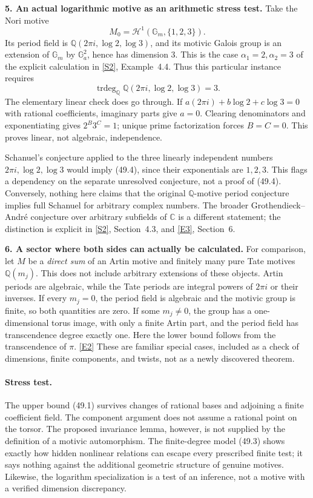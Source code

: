\documentclass[11pt,a4paper]{article}
\newcommand{\Q}{\mathbb{Q}}
\newcommand{\C}{\mathbb{C}}
\newcommand{\sref}[2]{\hyperlink{source:#1:#2}{[S#2]}}
\newcommand{\eref}[2]{\hyperlink{extra:#1:#2}{[E#2]}}
\numberwithin{equation}{section}
\begin{document}
\textbf{5. An actual logarithmic motive as an arithmetic stress test.}
Take the Nori motive
\[
 M_0=\mathcal H^1(\mathbb G_m,\{1,2,3\}).
\]
Its period field is $\Q(2\pi i,\log2,\log3)$, and its motivic Galois
group is an extension of $\mathbb G_m$ by $\mathbb G_a^2$, hence has
dimension $3$. This is the case $\alpha_1=2,\alpha_2=3$ of the explicit
calculation in \sref{statement}{2}, Example~4.4. Thus this particular instance
requires
\[
 \operatorname{trdeg}_{\Q}\Q(2\pi i,\log2,\log3)=3.
 \tag{49.4}
\]
The elementary linear check does go through. If
$a(2\pi i)+b\log2+c\log3=0$ with rational coefficients, imaginary parts
give $a=0$. Clearing denominators and exponentiating gives $2^B3^C=1$;
unique prime factorization forces $B=C=0$. This proves linear, not
algebraic, independence.

Schanuel's conjecture applied to the three linearly independent numbers
$2\pi i,\log2,\log3$ would imply (49.4), since their exponentials are
$1,2,3$. This flags a dependency on the separate unresolved conjecture,
not a proof of (49.4). Conversely, nothing here claims that the original
$\Q$-motive period conjecture implies full Schanuel for arbitrary complex
numbers. The broader Grothendieck--Andr\'e conjecture over arbitrary
subfields of $\C$ is a different statement; the distinction is explicit
in \sref{statement}{2}, Section~4.3, and \eref{statement}{3}, Section~6.

\textbf{6. A sector where both sides can actually be calculated.}
For comparison, let $M$ be a \emph{direct sum} of an Artin motive and
finitely many pure Tate motives $\Q(m_j)$. This does not include arbitrary
extensions of these objects. Artin periods are algebraic, while the Tate
periods are integral powers of $2\pi i$ or their inverses. If every
$m_j=0$, the period field is algebraic and the motivic group is finite,
so both quantities are zero. If some $m_j\ne0$, the group has a
one-dimensional torus image, with only a finite Artin part, and the period
field has transcendence degree exactly one. Here the lower bound follows
from the transcendence of $\pi$. \eref{statement}{2}
These are familiar special cases, included as a check of dimensions,
finite components, and twists, not as a newly discovered theorem.

\paragraph{Stress test.}
The upper bound (49.1) survives changes of rational bases and adjoining a
finite coefficient field. The component argument does not assume a rational
point on the torsor. The proposed invariance lemma, however, is not supplied
by the definition of a motivic automorphism. The finite-degree model (49.3)
shows exactly how hidden nonlinear relations can escape every prescribed
finite test; it says nothing against the additional geometric structure
of genuine motives. Likewise, the logarithm specialization is a test of
an inference, not a motive with a verified dimension discrepancy.
\end{document}
